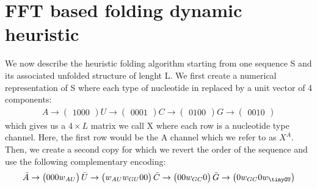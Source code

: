 \documentclass[a4paper,12pt]{article}
\begin{document}
\clearpage
\section{FFT based folding dynamic heuristic}
\label{sec:orgc101774}
We now describe the heuristic folding algorithm starting from one sequence S and
its associated unfolded structure of lenght L. We first create a numerical
representation of S where each type of nucleotide in replaced by a unit vector
of 4 components:
\begin{equation}
\begin{split}
A \rightarrow \begin{pmatrix} 1 0 0 0 \end{pmatrix}
U \rightarrow \begin{pmatrix} 0 0 0 1 \end{pmatrix}
C \rightarrow \begin{pmatrix} 0 1 0 0 \end{pmatrix}
G \rightarrow \begin{pmatrix} 0 0 1 0 \end{pmatrix}
\end{split}
\end{equation}
which gives us a \(4 \times L\) matrix we call X where each row is a nucleotide
type channel. Here, the first row would be the A channel which we refer to as
\(X^A\). Then, we create a second copy for which we revert the order of the
sequence and use the following complementary encoding:
\begin{equation}
\begin{split}
\bar{A} \rightarrow \begin{pmatrix} 0 0 0 w_{\tiny AU} \end{pmatrix}
\bar{U} \rightarrow \begin{pmatrix} w_{\tiny AU} w_{\tiny GU} 0 0 \end{pmatrix}
\bar{C} \rightarrow \begin{pmatrix} 0 0 w_{\tiny GC} 0 \end{pmatrix}
\bar{G} \rightarrow \begin{pmatrix} 0 w_{\tiny GC} 0 w_{\tinyGU} \end{pmatrix}
\end{split}
\end{equation}
\end{document}
